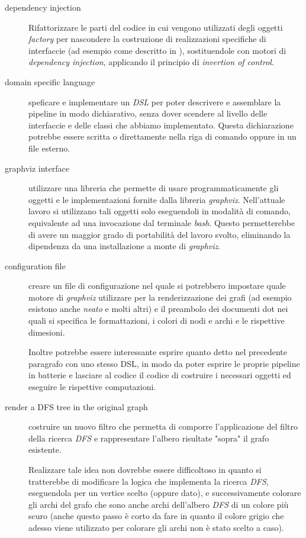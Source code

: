 \begin{description}
\item[dependency injection] Rifattorizzare le parti del codice in cui
  vengono utilizzati degli oggetti \emph{factory} per nascondere la
  costruzione di realizzazioni specifiche di interfaccie (ad esempio
  come descritto in ),
  sostituendole con motori di \emph{dependency injection}, applicando
  il principio di \emph{invertion of control}.
\item[domain specific language] speficare e implementare un \emph{DSL}
  per poter descrivere e assemblare la pipeline in modo dichiarativo,
  senza dover scendere al livello delle interfaccie e delle classi che
  abbiamo implementato. Questa dichiarazione potrebbe essere scritta o
  direttamente nella riga di comando oppure in un file esterno.
\item[graphviz interface] utilizzare una libreria che permette di
  usare programmaticamente gli oggetti e le implementazioni fornite
  dalla libreria \emph{graphviz}. Nell'attuale lavoro si utilizzano
  tali oggetti solo eseguendoli in modalit\`a di comando, equivalente
  ad una invocazione dal terminale \emph{bash}. Questo permetterebbe
  di avere un maggior grado di portabilit\`a del lavoro svolto,
  eliminando la dipendenza da una installazione a monte di
  \emph{graphviz}.
\item[configuration file] creare un file di configurazione nel quale
  si potrebbero impostare quale motore di \emph{graphviz} utilizzare
  per la renderizzazione dei grafi (ad esempio esistono anche
  \emph{neato} e molti altri) e il preambolo dei documenti dot nei
  quali si specifica le formattazioni, i colori di nodi e archi e le
  rispettive dimesioni.

  Inoltre potrebbe essere interessante esprire quanto detto nel
  precedente paragrafo con uno stesso DSL, in modo da poter esprire le
  proprie pipeline in batterie e lasciare al codice il codice di
  costruire i necessari oggetti ed eseguire le rispettive
  computazioni.

\item[render a DFS tree in the original graph] costruire un nuovo
  filtro che permetta di comporre l'applicazione del filtro della
  ricerca \emph{DFS} e rappresentare l'albero risultate "sopra" il
  grafo esistente.

  Realizzare tale idea non dovrebbe essere difficoltoso in quanto si
  tratterebbe di modificare la logica che implementa la ricerca
  \emph{DFS}, eseguendola per un vertice scelto (oppure dato), e
  successivamente colorare gli archi del grafo che sono anche archi
  dell'albero \emph{DFS} di un colore pi\`u scuro (anche questo passo
  \`e corto da fare in quanto il colore grigio che adesso viene
  utilizzato per colorare gli archi non \`e stato scelto a caso).


\end{description}
